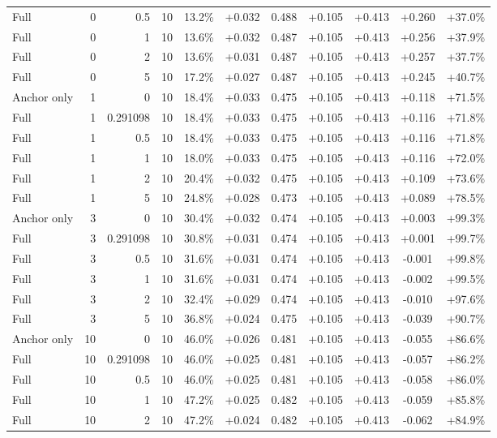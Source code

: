 \begin{table}[htbp]
\begin{tabular}{lrrrccccccc}
Full & 0 & 0.5 & 10 & 13.2\% & +0.032 & 0.488 & +0.105 & +0.413 & +0.260 & +37.0\% \\
Full & 0 & 1 & 10 & 13.6\% & +0.032 & 0.487 & +0.105 & +0.413 & +0.256 & +37.9\% \\
Full & 0 & 2 & 10 & 13.6\% & +0.031 & 0.487 & +0.105 & +0.413 & +0.257 & +37.7\% \\
Full & 0 & 5 & 10 & 17.2\% & +0.027 & 0.487 & +0.105 & +0.413 & +0.245 & +40.7\% \\
Anchor only & 1 & 0 & 10 & 18.4\% & +0.033 & 0.475 & +0.105 & +0.413 & +0.118 & +71.5\% \\
Full & 1 & 0.291098 & 10 & 18.4\% & +0.033 & 0.475 & +0.105 & +0.413 & +0.116 & +71.8\% \\
Full & 1 & 0.5 & 10 & 18.4\% & +0.033 & 0.475 & +0.105 & +0.413 & +0.116 & +71.8\% \\
Full & 1 & 1 & 10 & 18.0\% & +0.033 & 0.475 & +0.105 & +0.413 & +0.116 & +72.0\% \\
Full & 1 & 2 & 10 & 20.4\% & +0.032 & 0.475 & +0.105 & +0.413 & +0.109 & +73.6\% \\
Full & 1 & 5 & 10 & 24.8\% & +0.028 & 0.473 & +0.105 & +0.413 & +0.089 & +78.5\% \\
Anchor only & 3 & 0 & 10 & 30.4\% & +0.032 & 0.474 & +0.105 & +0.413 & +0.003 & +99.3\% \\
Full & 3 & 0.291098 & 10 & 30.8\% & +0.031 & 0.474 & +0.105 & +0.413 & +0.001 & +99.7\% \\
Full & 3 & 0.5 & 10 & 31.6\% & +0.031 & 0.474 & +0.105 & +0.413 & -0.001 & +99.8\% \\
Full & 3 & 1 & 10 & 31.6\% & +0.031 & 0.474 & +0.105 & +0.413 & -0.002 & +99.5\% \\
Full & 3 & 2 & 10 & 32.4\% & +0.029 & 0.474 & +0.105 & +0.413 & -0.010 & +97.6\% \\
Full & 3 & 5 & 10 & 36.8\% & +0.024 & 0.475 & +0.105 & +0.413 & -0.039 & +90.7\% \\
Anchor only & 10 & 0 & 10 & 46.0\% & +0.026 & 0.481 & +0.105 & +0.413 & -0.055 & +86.6\% \\
Full & 10 & 0.291098 & 10 & 46.0\% & +0.025 & 0.481 & +0.105 & +0.413 & -0.057 & +86.2\% \\
Full & 10 & 0.5 & 10 & 46.0\% & +0.025 & 0.481 & +0.105 & +0.413 & -0.058 & +86.0\% \\
Full & 10 & 1 & 10 & 47.2\% & +0.025 & 0.482 & +0.105 & +0.413 & -0.059 & +85.8\% \\
Full & 10 & 2 & 10 & 47.2\% & +0.024 & 0.482 & +0.105 & +0.413 & -0.062 & +84.9\% \\

\end{tabular}
\end{table}
